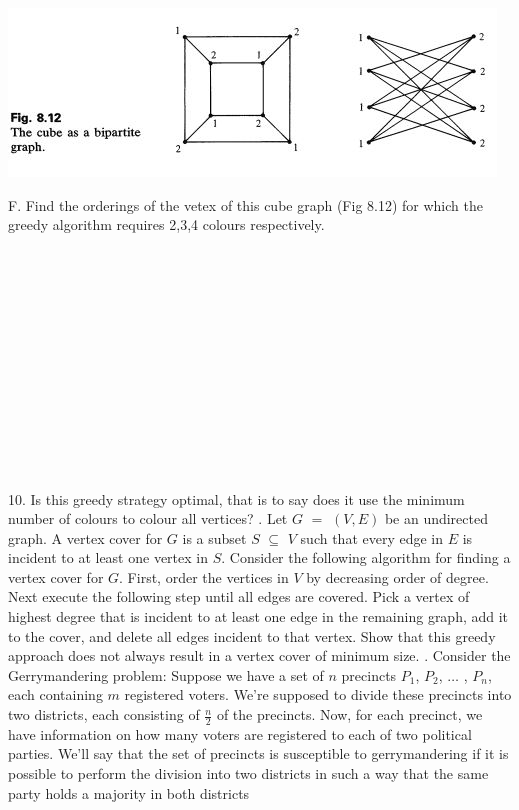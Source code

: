 \documentclass[12pt]{article}
\begin{document}
\noindent \centerline{\includegraphics[scale = 1]{cube.jpg}}
\noindent F. Find the orderings of the vetex of this cube graph (Fig 8.12) for which the greedy
algorithm requires 2,3,4 colours respectively.\\\\\\\\\\\\\\\\\\\\\\\\\\\\
10. Is this greedy strategy optimal, that is to say does it use the minimum number of colours to colour all vertices?
\newpage 
{}. Let $G$ $=$ $(V,E)$ be an undirected graph. A vertex cover for $G$ is a subset
$S$ $\subseteq$ $V$ such that every edge in $E$ is incident to at least one vertex in $S$.
Consider the following algorithm for finding a vertex cover for $G$. First,
order the vertices in $V$ by decreasing order of degree. Next execute the following
step until all edges are covered. Pick a vertex of highest degree that
is incident to at least one edge in the remaining graph, add it to the cover,
and delete all edges incident to that vertex. Show that this greedy approach
does not always result in a vertex cover of minimum size.
\newpage
{}. Consider the Gerrymandering problem: Suppose we have a set of $n$ precincts $P_1$, $P_2$, $\dots$ , $P_n$,
each containing $m$ registered voters. We’re supposed to divide these precincts into two districts,
each consisting of $\frac{n}{2}$ of the precincts. Now, for each precinct, we have information
on how many voters are registered to each of two political parties. We’ll say that the set of
precincts is susceptible to gerrymandering if it is possible to perform the division into two
districts in such a way that the same party holds a majority in both districts
\end{document}
